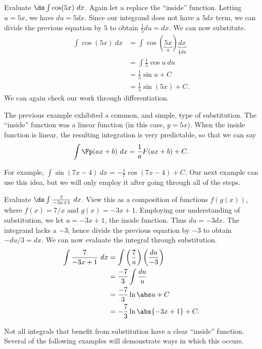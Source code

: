 \begin{example}\label{ex_sub2}
Evaluate $\ds \int \cos(5x)\ dx$.
\solution
Again let $u$ replace the ``inside'' function. Letting $u = 5x$, we have $du = 5dx$. Since our integrand does not have a $5dx$ term, we can divide the previous equation by $5$ to obtain $\frac15du = dx$. We can now substitute.
\begin{align*}
	\int \cos(5x)\ dx
	&= \int \cos(\underbrace{5x}_u) \underbrace{dx}_{\frac15du} \\
	&=	\int \frac15\cos u \ du \\
	&= \frac15\sin u + C \\
	&= \frac15\sin (5x)+C.
\end{align*}
We can again check our work through differentiation.
\end{example}

The previous example exhibited a common, and simple, type of substitution. The ``inside'' function was a linear function (in this case, $y = 5x$). When the inside function is linear, the resulting integration is very predictable, so that we can say
\[\int \Fp(ax+b)\ dx = \frac{1}{a}F(ax+b) + C.\]

For example, $\int \sin (7x-4)\ dx = -\frac17\cos(7x-4)+C$. Our next example can use this idea, but we will only employ it after going through all of the steps.

\begin{example}\label{ex_sub3}
Evaluate $\ds \int \frac{7}{-3x+1}\ dx$.
\solution
View this as a composition of functions $f(g(x))$, where $f(x) = 7/x$ and $g(x) = -3x+1$. Employing our understanding of substitution, we let $u = -3x+1$, the inside function. Thus $du = -3dx$. The integrand lacks a $-3$; hence divide the previous equation by $-3$ to obtain $-du/3 = dx$. We can now evaluate the integral through substitution.
\begin{align*}
	\int \frac{7}{-3x+1}\ dx
	&= \int\left(\frac{7}{u}\right)\left(\frac{du}{-3}\right) \\
	&= \frac{-7}3\int \frac{du}{u} \\
	&= \frac{-7}3\ln \abs u + C\\
	&= -\frac73\ln\abs{-3x+1} + C.
\end{align*}
\end{example}

Not all integrals that benefit from substitution have a clear ``inside'' function. Several of the following examples will demonstrate ways in which this occurs.


